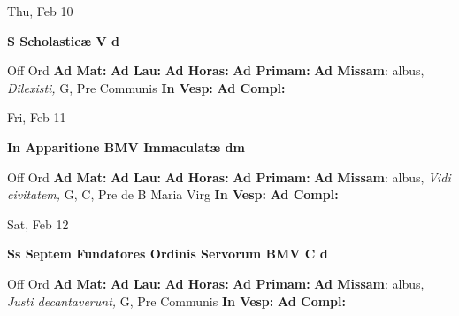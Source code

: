 \documentclass[10pt]{memoir}
\begin{document}
\begin{center}
\begin{minipage}{3.5in}
\vspace{2em}
\begin{center}Thu, Feb 10
\end{center}
\textbf{ \large S Scholasticæ V
\textnormal{\normalsize d}}

\begin{justify}Off Ord
\textbf{Ad Mat: }
\textbf{Ad Lau: }
\textbf{Ad Horas: }
\textbf{Ad Primam: }\textbf{Ad Missam}: albus, \textit{Dilexisti,} G, Pre Communis
\textbf{In Vesp: }
\textbf{Ad Compl: }
\end{justify}
\end{minipage}
\end{center}

\begin{center}
\begin{minipage}{3.5in}
\vspace{2em}
\begin{center}Fri, Feb 11
\end{center}
\textbf{ \large In Apparitione BMV Immaculatæ
\textnormal{\normalsize dm}}

\begin{justify}Off Ord
\textbf{Ad Mat: }
\textbf{Ad Lau: }
\textbf{Ad Horas: }
\textbf{Ad Primam: }\textbf{Ad Missam}: albus, \textit{Vidi civitatem,} G, C, Pre de B Maria Virg
\textbf{In Vesp: }
\textbf{Ad Compl: }
\end{justify}
\end{minipage}
\end{center}

\begin{center}
\begin{minipage}{3.5in}
\vspace{2em}
\begin{center}Sat, Feb 12
\end{center}
\textbf{ \large Ss Septem Fundatores Ordinis Servorum BMV C
\textnormal{\normalsize d}}

\begin{justify}Off Ord
\textbf{Ad Mat: }
\textbf{Ad Lau: }
\textbf{Ad Horas: }
\textbf{Ad Primam: }\textbf{Ad Missam}: albus, \textit{Justi decantaverunt,} G, Pre Communis
\textbf{In Vesp: }
\textbf{Ad Compl: }
\end{justify}
\end{minipage}
\end{center}
\end{document}
